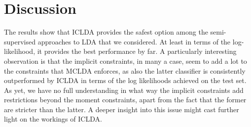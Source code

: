 %


\section{Discussion}
The results show that ICLDA provides the safest option among the semi-supervised approaches to LDA that we considered. At least in terms of the log-likelihood, it provides the best performance by far. A particularly interesting observation is that the implicit constraints, in many a case, seem to add a lot to the constraints that MCLDA enforces, as also the latter classifier is consistently outperformed by ICLDA in terms of the log likelihoods achieved on the test set. As yet, we have no full understanding in what way the implicit constraints add restrictions beyond the moment constraints, apart from the fact that the former are stricter than the latter.  A deeper insight into this issue might cast further light on the workings of ICLDA.

